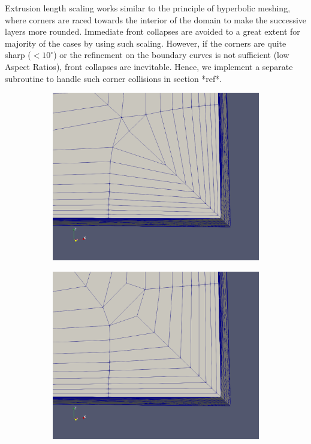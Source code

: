 Extrusion length scaling works similar to the principle of hyperbolic meshing, where corners are raced towards the interior of the domain to make the successive layers more rounded. Immediate front collapses are avoided to a great extent for majority of the cases by using such scaling. However, if the corners are quite sharp ($<10^{\circ}$) or the refinement on the boundary curves is not sufficient (low Aspect Ratios), front collapses are inevitable. Hence, we implement a separate subroutine to handle such corner collisions in section *ref*.


\begin{figure}
\centering
\begin{subfigure}{0.5\textwidth}
\includegraphics[width = 0.9\linewidth]{img/m1/extrusionScaling/withoutScaling.png}
\caption{}
\label{subfigure-extrusionScaling1}
\centering
\end{subfigure}%
\begin{subfigure}{0.5\textwidth}
\centering
\includegraphics[width = 0.9\linewidth]{img/m1/extrusionScaling/withScaling.png}

\end{subfigure}
\end{figure}
